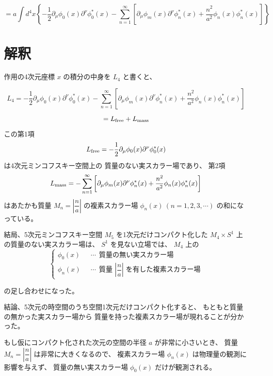 \documentclass{article}
\begin{document}
$$
	=
	a
	\int d^{4} x
	\left\{
	-
	\dfrac{1}{2}
	\partial_{\mu}
	\phi_{0}(x)
	\partial^{\nu}
	\phi_{0}^{*}(x)
	-
	\sum_{n=1}^{\infty}
	\left[
		\partial_{\mu}
		\phi_{m}(x)
		\partial^{\nu}
		\phi_{n}^{*}(x)
		+
		\dfrac{ n^{2} }{ a^{2} }
		\phi_{n}(x)
		\phi_{n}^{*}(x)
		\right]
	\right\}
$$

\section{解釈}

作用の4次元座標
$x$
の積分の中身を
$L_{4}$
と書くと、

$$
	L_{4}
	=
	-
	\dfrac{1}{2}
	\partial_{\mu}
	\phi_{0}(x)
	\partial^{\nu}
	\phi_{0}^{*}(x)
	-
	\sum_{n=1}^{\infty}
	\left[
		\partial_{\mu}
		\phi_{m}(x)
		\partial^{\nu}
		\phi_{n}^{*}(x)
		+
		\dfrac{ n^{2} }{ a^{2} }
		\phi_{n}(x)
		\phi_{n}^{*}(x)
		\right]
$$

$$
	=
	L_{\rm free}
	+
	L_{\rm mass}
$$

この第1項
$$
	L_{\rm free}
	=
	-
	\dfrac{1}{2}
	\partial_{\mu}
	\phi_{0}(x)
	\partial^{\nu}
	\phi_{0}^{*}(x)
$$
は4次元ミンコフスキー空間上の
質量のない実スカラー場であり、
第2項
$$
	L_{\rm mass}
	=
	-
	\sum_{n=1}^{\infty}
	\left[
		\partial_{\mu}
		\phi_{m}(x)
		\partial^{\nu}
		\phi_{n}^{*}(x)
		+
		\dfrac{ n^{2} }{ a^{2} }
		\phi_{n}(x)
		\phi_{n}^{*}(x)
		\right]
$$
はあたかも質量
$M_{n} = \left| \dfrac{n}{a} \right|$
の複素スカラー場
$\phi_{n}(x) \ ( n=1,2,3, \cdots )$
の和になっている。

結局、5次元ミンコフスキー空間
$M_{5}$
を1次元だけコンパクト化した
$M_{4} \times S^{1}$
上の質量のない実スカラー場は、
$S^{1}$
を見ない立場では、
$M_{4}$
上の
\begin{equation*}
	\begin{cases}
		\phi_{0}(x) & \ \ \ \cdots \ \ \text{質量の無い実スカラー場}                                  \\
		\phi_{n}(x) & \ \ \ \cdots \ \ \text{質量 $\left| \dfrac{n}{a} \right|$ を有した複素スカラー場}
	\end{cases}
\end{equation*}

の足し合わせになった。

結論、5次元の時空間のうち空間1次元だけコンパクト化すると、
もともと質量の無かった実スカラー場から
質量を持った複素スカラー場が現れることが分かった。

もし仮にコンパクト化された次元の空間の半径
$a$
が非常に小さいとき、
質量
$M_{n} = \left| \dfrac{n}{a} \right|$
は非常に大きくなるので、
複素スカラー場
$\phi_{n}(x)$
は物理量の観測に影響を与えず、
質量の無い実スカラー場
$\phi_{0}(x)$
だけが観測される。
\end{document}
